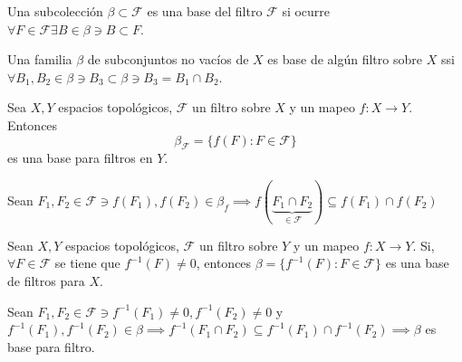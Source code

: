 \begin{definicion}
    Una subcolección $\beta\subset \mathcal{F}$ es una base del filtro $\mathcal{F}$ si ocurre $\forall F\in \mathcal{F}\exists B\in \beta\ni B\subset F$.
\end{definicion}

\begin{teorema}
    Una familia $\beta$ de subconjuntos no vacíos de $X$ es base de algún filtro sobre $X$ ssi $\forall B_1,B_2\in \beta \ni B_3 \subset \beta \ni B_3 = B_1\cap B_2$.
\end{teorema}




 \begin{teorema}
    Sea $X,Y$ espacios topológicos, $\mathcal{F}$ un filtro sobre $X$ y un mapeo $f:X\to Y$. Entonces 
    $$\beta_{\mathcal{F}}=\{f(F):F\in \mathcal{F}\}$$
    es una base para filtros en $Y$. 
    \begin{dem}
        Sean $F_1,F_2\in \mathcal{F}\ni f(F_1),f(F_2)\in \beta_f\implies f(\underbrace{F_1\cap F_2}_{\in \mathcal{F}}) \subseteq f(F_1)\cap f(F_2)$
    \end{dem}
 \end{teorema}

 \begin{teorema}
    Sean $X,Y$ espacios topológicos, $\mathcal{F}$ un filtro sobre $Y$ y un mapeo $f:X\to Y$. Si, $\forall F\in \mathcal{F}$ se tiene que $f^{-1}(F)\neq 0$, entonces $\beta=\{f^{-1}(F):F\in \mathcal{F}\}$ es una base de filtros para $X$. 
    \begin{dem}
        Sean $F_1,F_2\in\mathcal{F}\ni f^{-1}(F_1)\neq 0,f^{-1}(F_2)\neq 0$ y $f^{-1}(F_1),f^{-1}(F_2)\in \beta\implies f^{-1}(F_1\cap F_2)\subseteq f^{-1}(F_1)\cap f^{-1}(F_2)\implies \beta$ es base para filtro. 
    \end{dem} 
 \end{teorema}

